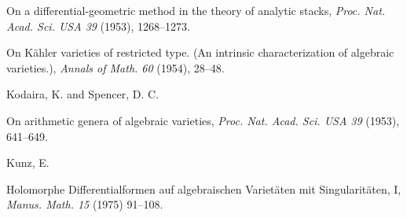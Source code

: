 {\noindent\hangindent=25bp\hspace*{6bp}%
On a differential-geometric method in the theory of analytic stacks, \emph{Proc. Nat. Acad. Sci. USA 39} (1953), 1268--1273.\par
\noindent\hangindent=25bp\hspace*{6bp}%
On K\"ahler varieties of restricted type. (An intrinsic characterization of algebraic varieties.), \emph{Annals of Math. 60} (1954), 28--48.\par
\par\vspace{2.15pt}\noindent \hypertarget{bib-478-17}{}Kodaira, K. and Spencer, D. C.\par
\noindent\hangindent=25bp\hspace*{6bp}%
On arithmetic genera of algebraic varieties, \emph{Proc. Nat. Acad. Sci. USA 39} (1953), 641--649.\par
\par\vspace{2.15pt}\noindent \hypertarget{bib-478-18}{}Kunz, E.\par
\noindent\hangindent=25bp\hspace*{6bp}%
Holomorphe Differentialformen auf algebraischen Variet\"aten mit Singularit\"aten, I, \emph{Manus. Math. 15} (1975) 91--108.\par
}
